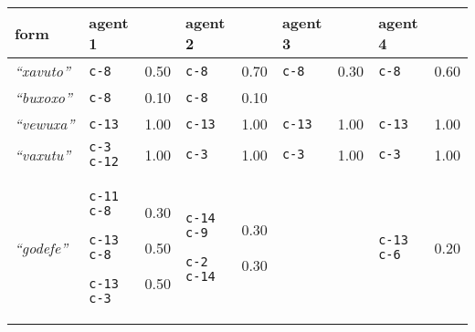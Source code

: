 
{\footnotesize\renewcommand{\arraystretch}{1.5}
\begin{tabular}{@{}p{1.2cm}|p{1.6cm}@{}p{0.8cm}@{}|p{1.6cm}@{}p{0.8cm}@{}|p{1.6cm}@{}p{0.8cm}@{}|p{1.6cm}@{}p{0.8cm}@{}}
form & agent 1 &  & agent 2 &  & agent 3 &  & agent 4 & \\
\hline
\textit{``xavuto''}&\texttt{c-8}
&0.50&\texttt{c-8}
&0.70&\texttt{c-8}
&0.30&\texttt{c-8}
&0.60\\
\hline
\textit{``buxoxo''}&\texttt{c-8}
&0.10&\texttt{c-8}
&0.10&&&&\\
\hline
\textit{``vewuxa''}&\texttt{c-13}
&1.00&\texttt{c-13}
&1.00&\texttt{c-13}
&1.00&\texttt{c-13}
&1.00\\
\hline
\textit{``vaxutu''}&\texttt{c-3 c-12}
&1.00&\texttt{c-3}
&1.00&\texttt{c-3}
&1.00&\texttt{c-3}
&1.00\\
\hline
\textit{``godefe''}&\texttt{c-11 c-8}


\texttt{c-13 c-8}


\texttt{c-13 c-3}
&0.30

0.50

0.50&\texttt{c-14 c-9}


\texttt{c-2 c-14}
&0.30

0.30&&&\texttt{c-13 c-6}
&0.20\\
\end{tabular}}
